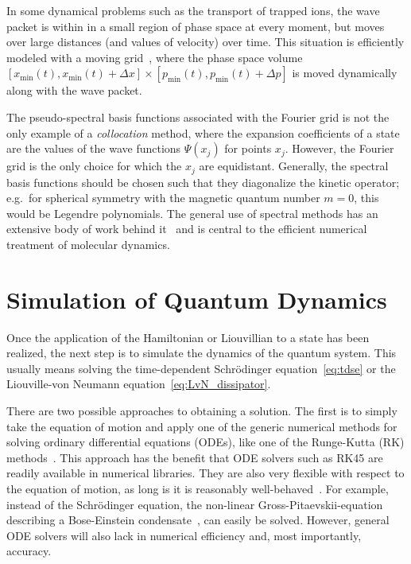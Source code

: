 In some dynamical problems such as the transport of trapped ions, the wave
packet is within in a small region of phase space at every moment, but moves
over large distances (and values of velocity) over time. This situation is
efficiently modeled with a moving grid~\cite{SingerRMP10,FuerstNJP2014}, where
the phase space volume $[x_{\min}(t), x_{\min}(t)+\Delta x] \times [p_{\min}(t),
p_{\min}(t) + \Delta p]$  is moved dynamically along with the wave packet.

The pseudo-spectral basis functions associated with the Fourier grid is not
the only example of a \emph{collocation} method, where the expansion
coefficients of a state are the values of the wave functions $\Psi(x_j)$ for
points $x_j$. However, the Fourier grid is the only choice for which the $x_j$
are equidistant. Generally, the spectral basis functions should be chosen such
that they diagonalize the kinetic operator; e.g.\ for spherical symmetry with
the magnetic quantum number $m=0$, this would be Legendre polynomials.
The general use of spectral methods has an extensive body of work behind
it~\cite{BoydSpectral} and is central to the efficient numerical treatment of
molecular dynamics.


\section{Simulation of Quantum Dynamics}

Once the application of the Hamiltonian or Liouvillian to a state has been
realized, the next step is to simulate the dynamics of the quantum system. This
usually means solving the time-dependent Schrödinger equation~\eqref{eq:tdse} or
the Liouville-von Neumann equation~\eqref{eq:LvN_dissipator}.

There are two possible approaches to obtaining a solution. The first is to
simply take the equation of motion and apply one of the generic numerical
methods for solving ordinary differential
equations (ODEs), like one of the Runge-Kutta (RK)
methods~\cite{LambertODEBook,NumRecipesFortran}.
%
This approach has the benefit that ODE solvers such as RK45 are readily
available in numerical libraries. They are also very flexible
with respect to the equation of motion, as long is it is reasonably
well-behaved~\cite{LambertODEBook}. For example, instead of the Schrödinger
equation, the non-linear Gross-Pitaevskii-equation describing a Bose-Einstein
condensate~\cite{LeggettRMP2001}, can easily be solved. However, general ODE
solvers will also lack in numerical efficiency and, most importantly, accuracy.

